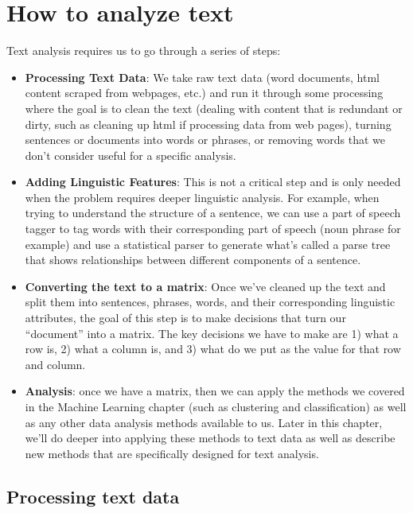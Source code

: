 \documentclass[]{krantz}
\begin{document}
\section{How to analyze text}\label{how-to-analyze-text}

Text analysis requires us to go through a series of steps:

\begin{itemize}
\item
  \textbf{Processing Text Data}: We take raw text data (word documents,
  html content scraped from webpages, etc.) and run it through some
  processing where the goal is to clean the text (dealing with content
  that is redundant or dirty, such as cleaning up html if processing
  data from web pages), turning sentences or documents into words or
  phrases, or removing words that we don't consider useful for a
  specific analysis.
\item
  \textbf{Adding Linguistic Features}: This is not a critical step and
  is only needed when the problem requires deeper linguistic analysis.
  For example, when trying to understand the structure of a sentence, we
  can use a part of speech tagger to tag words with their corresponding
  part of speech (noun phrase for example) and use a statistical parser
  to generate what's called a parse tree that shows relationships
  between different components of a sentence.
\item
  \textbf{Converting the text to a matrix}: Once we've cleaned up the
  text and split them into sentences, phrases, words, and their
  corresponding linguistic attributes, the goal of this step is to make
  decisions that turn our ``document'' into a matrix. The key decisions
  we have to make are 1) what a row is, 2) what a column is, and 3) what
  do we put as the value for that row and column.
\item
  \textbf{Analysis}: once we have a matrix, then we can apply the
  methods we covered in the Machine Learning chapter (such as clustering
  and classification) as well as any other data analysis methods
  available to us. Later in this chapter, we'll do deeper into applying
  these methods to text data as well as describe new methods that are
  specifically designed for text analysis.
\end{itemize}

\subsection{Processing text data}\label{processing-text-data}
\end{document}
